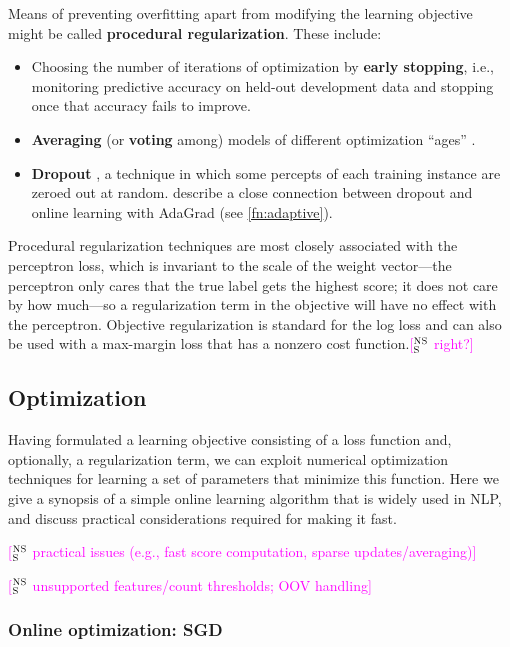 \documentclass[11pt,letterpaper]{article}
\newcommand{\ensuretext}[1]{#1}
\newcommand{\nssmarker}{\ensuretext{\textcolor{magenta}{\ensuremath{^{\textsc{NS}}_{\textsc{S}}}}}}
\newcommand{\arkcomment}[3]{\ensuretext{\textcolor{#3}{[#1 #2]}}}
\newcommand{\nss}[1]{\arkcomment{\nssmarker}{#1}{magenta}}
\newcommand{\fnref}[1]{\autoref{#1}} %
\begin{document}
Means of preventing overfitting apart from modifying the learning objective might be called \textbf{procedural regularization}. 
These include:
\begin{itemize}
  \item Choosing the number of iterations of optimization by \textbf{early stopping}, i.e., 
  monitoring predictive accuracy on held-out development data and stopping once that accuracy fails to improve.
  \item \textbf{Averaging} (or \textbf{voting} among) models of different optimization ``ages'' \citep{freund-99}.
  \item \textbf{Dropout} \citep{hinton-12,baldi-13}, a technique in which some percepts of each training instance are zeroed out 
  at random. \citet{wager-13} describe a close connection between dropout and online learning with AdaGrad (see \fnref{fn:adaptive}).
\end{itemize}

Procedural regularization techniques are most closely associated with the perceptron loss, 
which is invariant to the scale of the weight vector---the perceptron only cares that the true label gets the highest score; 
it does not care by how much---so a regularization term in the objective will have no effect with the perceptron.
Objective regularization is standard for the log loss 
and can also be used with a max-margin loss that has a nonzero cost function.\nss{right?}

\subsection{Optimization}

Having formulated a learning objective consisting of a loss function and, optionally, a regularization term, 
we can exploit numerical optimization techniques for learning a set of parameters that minimize this function.
Here we give a synopsis of a simple online learning algorithm that is widely used in NLP, 
and discuss practical considerations required for making it fast.

\nss{practical issues (e.g., fast score computation, sparse updates/averaging)}

\nss{unsupported features/count thresholds; OOV handling}

\subsubsection{Online optimization: SGD}\label{sec:online}
\end{document}
